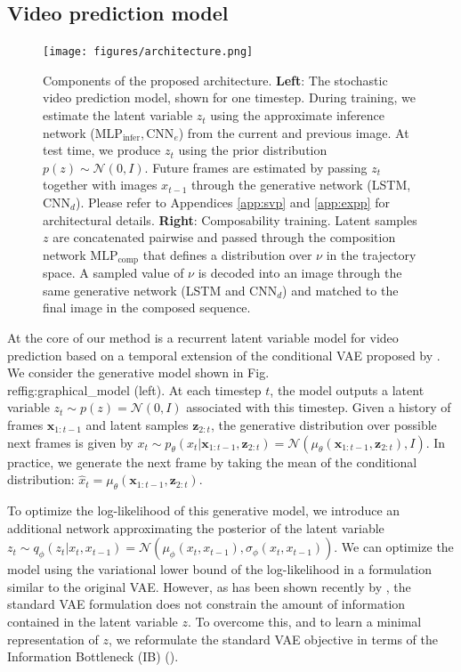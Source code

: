 \documentclass{article} %
\begin{document}
\subsection{Video prediction model}
\label{sec:video_pred}

\begin{figure}[t]
  \centering
   \texttt{[image: figures/architecture.png]}~~~~~~
  \caption{Components of the proposed architecture. \textbf{Left}: The stochastic video prediction model, shown for one timestep. During training, we estimate the latent variable \({z}_t\) using the approximate inference network (\(\text{MLP}_{\text{infer}}, \text{CNN}_e\)) from the current and previous image. At test time, we produce $z_t$ using the prior distribution \(p({z}) \sim \mathcal{N}(0, I)\). Future frames are estimated by passing  $z_{t}$ together with images $x_{t-1}$ through the generative network (LSTM, \(\text{CNN}_d\)). Please refer to  Appendices \ref{app:svp} and \ref{app:expp} for architectural details. \textbf{Right}: Composability training. Latent samples $z$ are concatenated pairwise and passed through the composition network \(\text{MLP}_{\text{comp}}\) that defines a distribution over $\nu$ in the trajectory space. A sampled value of $\nu$ is decoded into an image through the same generative network (LSTM and CNN$_d$) and matched to the final image in the composed sequence.  }
  \label{fig:graphical_model}
  \vspace{-10pt}
\end{figure}

At the core of our method is a recurrent latent variable model for video prediction based on a temporal extension of the conditional VAE proposed by \cite{chung2015recurrent}.  We consider the generative model shown in Fig.\\ref{fig:graphical_model} (left). At each timestep $t$, the model outputs a latent variable \(z_t \sim p(z) = \mathcal{N}(0,I)\) associated with this timestep. Given a history of frames \(\mathbf{x}_{1:t-1}\) and latent samples \(\mathbf{z}_{2:t}\), the generative distribution over possible next frames is given by \(x_t \sim p_\theta(x_t | \mathbf{x}_{1:t-1}, \mathbf{z}_{2:t}) = \mathcal{N}(\mu_\theta(\mathbf{x}_{1:t-1}, \mathbf{z}_{2:t}), I)\). In practice, we generate the next frame 
by taking the mean of the conditional distribution: \(\hat{x}_t = \mu_\theta(\mathbf{x}_{1:t-1}, \mathbf{z}_{2:t})\).

To optimize the log-likelihood of this generative model, we introduce an additional network approximating the  posterior of the latent variable \(z_t \sim q_\phi(z_t | x_t, x_{t-1}) = \mathcal{N}(\mu_\phi(x_t, x_{t-1}),\sigma_\phi(x_t, x_{t-1}))\). We can optimize the model using the variational lower bound of the log-likelihood in a formulation similar to the original VAE. However, as has been shown recently by \cite{pmlr-v80-alemi18a}, the standard VAE formulation does not constrain the amount of information contained in the latent variable $z$. To overcome this, and to learn a minimal representation of $z$, we reformulate the standard VAE objective in terms of the Information Bottleneck (IB) (\cite{shwartz2017opening}). 
\end{document}
